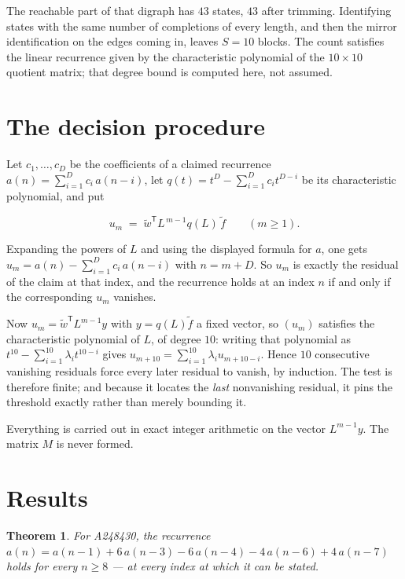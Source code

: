 \documentclass[11pt]{article}
\newtheorem{theorem}{Theorem}
\theoremstyle{definition}
\begin{document}
The reachable part of that digraph has $43$ states, $43$ after trimming. Identifying states with the same number of completions of every length, and then the mirror identification on the edges coming in, leaves $S = 10$ blocks. The count satisfies the linear recurrence given by the characteristic polynomial of the $10\times10$ quotient matrix; that degree bound is computed here, not assumed.

\section{The decision procedure}

Let $c_1,\dots,c_D$ be the coefficients of a claimed recurrence $a(n) = \sum_{i=1}^{D} c_i\,a(n-i)$, let $q(t) = t^{D} - \sum_{i=1}^{D} c_i t^{D-i}$ be its characteristic polynomial, and put

\[u_m \;=\; \tilde w^{\mathsf T} L^{\,m-1} q(L)\,\tilde f \qquad (m \ge 1).\]

Expanding the powers of $L$ and using the displayed formula for $a$, one gets $u_m = a(n) - \sum_{i=1}^{D} c_i\,a(n-i)$ with $n = m + D$. So $u_m$ is exactly the residual of the claim at that index, and the recurrence holds at an index $n$ if and only if the corresponding $u_m$ vanishes.

Now $u_m = \tilde w^{\mathsf T} L^{m-1} y$ with $y = q(L)\tilde f$ a fixed vector, so $(u_m)$ satisfies the characteristic polynomial of $L$, of degree $10$: writing that polynomial as $t^{10} - \sum_{i=1}^{10} \lambda_i t^{10-i}$ gives $u_{m+10} = \sum_{i=1}^{10} \lambda_i u_{m+10-i}$. Hence $10$ consecutive vanishing residuals force every later residual to vanish, by induction. The test is therefore finite; and because it locates the {\itshape last} nonvanishing residual, it pins the threshold exactly rather than merely bounding it.

Everything is carried out in exact integer arithmetic on the vector $L^{m-1}y$. The matrix $M$ is never formed.

\section{Results}

\begin{theorem} For A248430, the recurrence $a(n) = a(n-1) + 6\,a(n-3) - 6\,a(n-4) - 4\,a(n-6) + 4\,a(n-7)$ holds for every $n \ge 8$ --- at every index at which it can be stated.\end{theorem}
\end{document}
